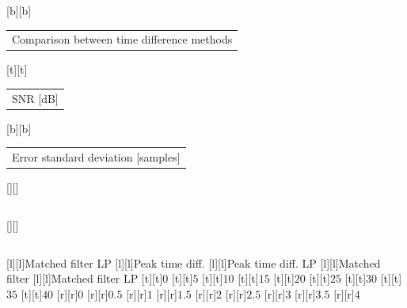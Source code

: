 %
\begin{psfrags}%
\psfragscanon%
%
[b][b]{\fontsize{8}{12}\selectfont \setlength{\tabcolsep}{0pt}\begin{tabular}{c}Comparison between time difference methods\end{tabular}}%
[t][t]{\fontsize{8}{12}\selectfont \setlength{\tabcolsep}{0pt}\begin{tabular}{c}SNR [dB]\end{tabular}}%
[b][b]{\fontsize{8}{12}\selectfont \setlength{\tabcolsep}{0pt}\begin{tabular}{c}Error standard deviation [samples]\end{tabular}}%
[][]{\fontsize{10}{15}\selectfont \setlength{\tabcolsep}{0pt}\begin{tabular}{c} \end{tabular}}%
[][]{\fontsize{10}{15}\selectfont \setlength{\tabcolsep}{0pt}\begin{tabular}{c} \end{tabular}}%
[l][l]{\fontsize{4}{6}\selectfont Matched filter LP}%
[l][l]{\fontsize{4}{6}\selectfont Peak time diff.}%
[l][l]{\fontsize{4}{6}\selectfont Peak time diff. LP}%
[l][l]{\fontsize{4}{6}\selectfont Matched filter}%
[l][l]{\fontsize{4}{6}\selectfont Matched filter LP}%
%
\fontsize{6}{8}%
\selectfont%
%
[t][t]{$0$}%
[t][t]{$5$}%
[t][t]{$10$}%
[t][t]{$15$}%
[t][t]{$20$}%
[t][t]{$25$}%
[t][t]{$30$}%
[t][t]{$35$}%
[t][t]{$40$}%
%
[r][r]{$0$}%
[r][r]{$0.5$}%
[r][r]{$1$}%
[r][r]{$1.5$}%
[r][r]{$2$}%
[r][r]{$2.5$}%
[r][r]{$3$}%
[r][r]{$3.5$}%
[r][r]{$4$}%
%

\end{psfrags}
